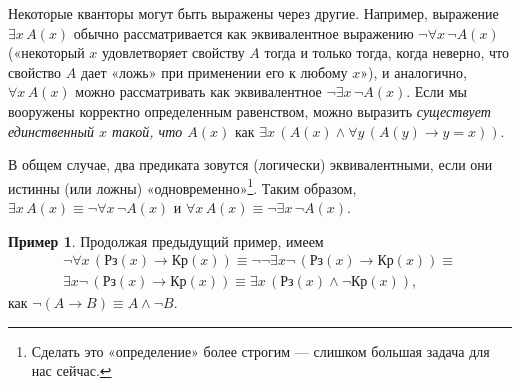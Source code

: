 \documentclass[12pt,notitlepage]{article}
\theoremstyle{plain}
\theoremstyle{definition}
\newtheorem{exm}[thm]{Пример}
\theoremstyle{plain}
\newcommand{\1}{\mathbf{1}}
\newcommand{\0}{\mathbf{0}}
\begin{document}
Некоторые кванторы могут быть выражены через другие. Например, выражение $\exists x\, A(x)$ обычно рассматривается как эквивалентное выражению $\neg \forall x\, \neg A(x)$ («некоторый $x$ удовлетворяет свойству $A$ тогда и только тогда, когда неверно, что свойство $A$ дает «ложь» при применении его к любому $x$»), и аналогично, $\forall x\, A(x)$ можно рассматривать как эквивалентное $\neg \exists x\, \neg A(x)$. Если мы вооружены корректно определенным равенством, можно выразить \emph{существует единственный $x$ такой, что $A(x)$} как $\exists x\, (A(x) \wedge \forall y\, (A(y) \to y = x))$.

В общем случае, два предиката зовутся (логически) эквивалентными, если они истинны (или ложны) «одновременно»\footnote{Сделать это «определение» более строгим --- слишком большая задача для нас сейчас.}. Таким образом, $\exists x\, A(x) \equiv \neg \forall x\, \neg A(x)$ и $\forall x\, A(x) \equiv \neg \exists x\, \neg A(x)$.

\begin{exm}
	Продолжая предыдущий пример, имеем 
	\begin{multline*}
		\neg \forall x\, (\text{Рз}(x) \to \text{Кр}(x)) \equiv \neg \neg \exists x \neg\, (\text{Рз}(x) \to \text{Кр}(x)) \equiv\\
		\exists x \neg\, (\text{Рз}(x) \to \text{Кр}(x)) \equiv\exists x\, (\text{Рз}(x) \wedge \neg \text{Кр}(x)),
	\end{multline*}
	как $\neg (A \to B) \equiv A \wedge \neg B$.
\end{exm}
\end{document}
